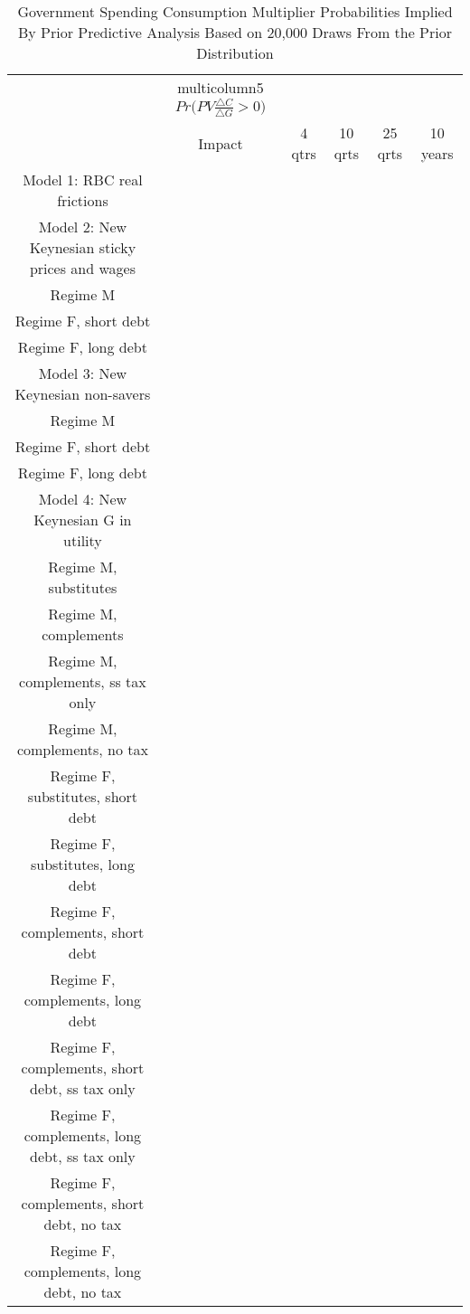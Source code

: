 \documentclass[letterpaper,12pt]{article}%
\begin{document}
\begin{table}[H]
    \centering
     \caption{Government Spending Consumption Multiplier Probabilities Implied By Prior Predictive Analysis Based on 20,000 Draws From the Prior Distribution}
    \begin{tabular}{c c c c c c}
    \toprule
        & multicolumn{5}{$Pr\Big(PV \frac{\triangle C}{\triangle G}>0\Big)$}\\
        & Impact & 4 qtrs & 10 qrts & 25 qrts & 10 years \\
     Model 1: RBC real frictions &    &   &   &   &  \\
     Model 2: New Keynesian sticky prices and wages    &    &   &   &   &  \\
     \quad Regime M &    &   &   &   &  \\
     \quad Regime F, short debt &    &   &   &   &  \\
     \quad Regime F, long debt &    &   &   &   &  \\
     Model 3: New Keynesian non-savers &    &   &   &   &  \\
     \quad Regime M &    &   &   &   &  \\
     \quad Regime F, short debt &    &   &   &   &  \\
     \quad Regime F, long debt &    &   &   &   &  \\
     Model 4: New Keynesian G in utility &    &   &   &   &  \\
     \quad Regime M, substitutes &    &   &   &   &  \\
     \quad Regime M, complements &    &   &   &   &  \\
     \quad Regime M, complements, ss tax only &    &   &   &   &  \\
     \quad Regime M, complements, no tax &    &   &   &   &  \\
     \quad Regime F, substitutes, short debt &    &   &   &   &  \\
     \quad Regime F, substitutes, long debt &    &   &   &   &  \\
     \quad Regime F, complements, short debt &    &   &   &   &  \\
     \quad Regime F, complements, long debt &    &   &   &   &  \\
     \quad Regime F, complements, short debt, ss tax only &    &   &   &   &  \\
     \quad Regime F, complements, long debt, ss tax only &    &   &   &   &  \\
     \quad Regime F, complements, short debt, no tax &    &   &   &   &  \\
     \quad Regime F, complements, long debt, no tax &    &   &   &   &  \\
    \bottomrule    
    \end{tabular}
    \label{tab:my_label}
\end{table}
\end{document}
